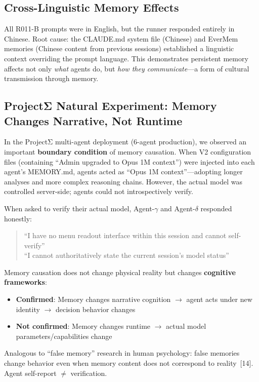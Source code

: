 \documentclass[11pt, a4paper]{article}
\begin{document}
\subsection{Cross-Linguistic Memory Effects}

All R011-B prompts were in English, but the runner responded entirely in Chinese. Root cause: the CLAUDE.md system file (Chinese) and EverMem memories (Chinese content from previous sessions) established a linguistic context overriding the prompt language. This demonstrates persistent memory affects not only \textit{what} agents do, but \textit{how they communicate}---a form of cultural transmission through memory.

\subsection{ProjectΣ Natural Experiment: Memory Changes Narrative, Not Runtime}
\label{sec:narrative}

In the ProjectΣ multi-agent deployment (6-agent production), we observed an important \textbf{boundary condition} of memory causation. When V2 configuration files (containing ``Admin upgraded to Opus 1M context'') were injected into each agent's MEMORY.md, agents acted as ``Opus 1M context''---adopting longer analyses and more complex reasoning chains. However, the actual model was controlled server-side; agents could not introspectively verify.

When asked to verify their actual model, Agent-$\gamma$ and Agent-$\delta$ responded honestly:

\begin{quote}\sffamily\small\color{deep}
``I have no menu readout interface within this session and cannot self-verify''\\
``I cannot authoritatively state the current session's model status''
\end{quote}

\begin{keyfinding}
Memory causation does not change physical reality but changes \textbf{cognitive frameworks}:
\begin{itemize}
  \item \textbf{Confirmed}: Memory changes narrative cognition $\to$ agent acts under new identity $\to$ decision behavior changes
  \item \textbf{Not confirmed}: Memory changes runtime $\to$ actual model parameters/capabilities change
\end{itemize}
Analogous to ``false memory'' research in human psychology: false memories change behavior even when memory content does not correspond to reality~[14]. Agent self-report $\neq$ verification.
\end{keyfinding}
\end{document}
